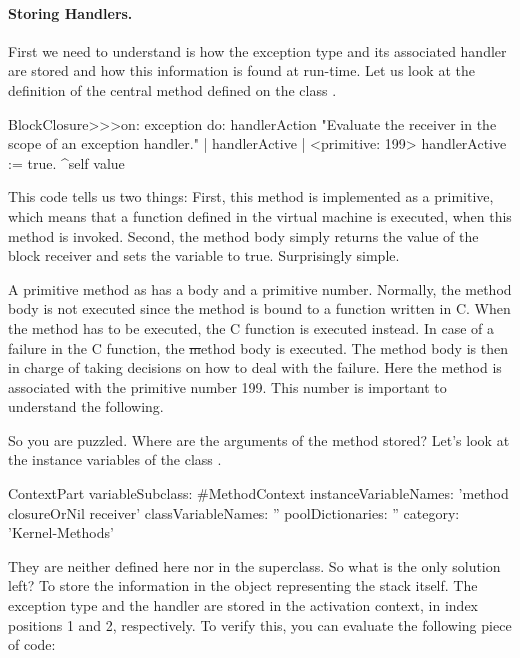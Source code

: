 \documentclass[a4paper,10pt,twoside]{book}
\begin{document}
\paragraph{Storing Handlers.}
First we need to understand is how the exception type and its associated handler  are stored and how this information is found at run-time. Let us look at the definition of the central method  defined on the class . %

\begin{code}{}
BlockClosure>>>on: exception do: handlerAction 
	"Evaluate the receiver in the scope of an exception handler." 
	| handlerActive | 
	<primitive: 199> 
	handlerActive := true. 
	^self value 
\end{code}

This code tells us two things: First, this method is implemented as a primitive, which means that  a function defined in the virtual machine is executed, when this method is invoked. Second, the method body simply returns the value of the block receiver and sets the variable  to true. Surprisingly simple. 

A primitive method as  has a body and a primitive number. Normally, the method body is not executed since the method is bound to a function written in C. When the method has to be executed, the C function is executed instead. In case of a failure in the C function, the \st method body is executed. The method body is then in charge of taking decisions on how to deal with the failure.
Here the method  is associated with the primitive number 199. This number is important to understand the following. 

So you are puzzled. Where are the arguments of the  method stored? Let's look at the instance variables of the class . 

\begin{code}{}
ContextPart variableSubclass: #MethodContext
	instanceVariableNames: 'method closureOrNil receiver'
	classVariableNames: ''
	poolDictionaries: ''
	category: 'Kernel-Methods'
\end{code}

They are neither defined here nor in the superclass. So what is the only solution left? To store the information in the object representing the stack itself. The exception type and the handler are stored in the activation context, in index positions 1 and 2, respectively. To verify this, you can evaluate the following piece of code:
\end{document}
